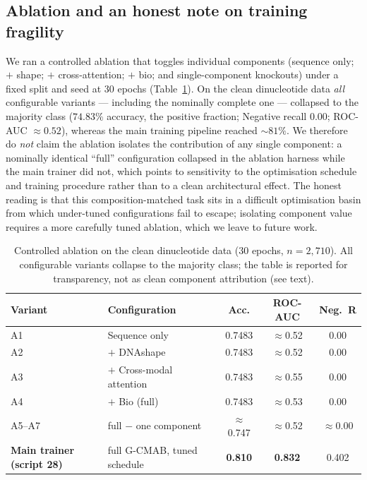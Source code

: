 \documentclass[11pt]{article}
\begin{document}
\subsection{Ablation and an honest note on training fragility}
We ran a controlled ablation that toggles individual components (sequence only;
$+$ shape; $+$ cross-attention; $+$ bio; and single-component knockouts) under a
fixed split and seed at $30$ epochs (Table~\ref{tab:abl}). On the clean dinucleotide
data \emph{all} configurable variants --- including the nominally complete one ---
collapsed to the majority class ($74.83\%$ accuracy, the positive fraction;
Negative recall $0.00$; ROC-AUC $\approx 0.52$), whereas the main training pipeline
reached $\sim\!81\%$. We therefore do \emph{not} claim the ablation isolates the
contribution of any single component: a nominally identical ``full'' configuration
collapsed in the ablation harness while the main trainer did not, which points to
sensitivity to the optimisation schedule and training procedure rather than to a
clean architectural effect. The honest reading is that this composition-matched task
sits in a difficult optimisation basin from which under-tuned configurations fail to
escape; isolating component value requires a more carefully tuned ablation, which we
leave to future work.

\begin{table}[ht]
\centering
\caption{Controlled ablation on the clean dinucleotide data ($30$ epochs,
$n=2{,}710$). All configurable variants collapse to the majority class; the table is
reported for transparency, not as clean component attribution (see text).}
\label{tab:abl}
\begin{tabular}{llccc}
\toprule
Variant & Configuration & Acc. & ROC-AUC & Neg.\ R \\
\midrule
A1 & Sequence only            & 0.7483 & $\approx$0.52 & 0.00 \\
A2 & $+$ DNAshape              & 0.7483 & $\approx$0.52 & 0.00 \\
A3 & $+$ Cross-modal attention & 0.7483 & $\approx$0.55 & 0.00 \\
A4 & $+$ Bio (full)           & 0.7483 & $\approx$0.53 & 0.00 \\
A5--A7 & full $-$ one component & $\approx$0.747 & $\approx$0.52 & $\approx$0.00 \\
\midrule
\textbf{Main trainer (script 28)} & full G-CMAB, tuned schedule & \textbf{0.810} & \textbf{0.832} & 0.402 \\
\bottomrule
\end{tabular}
\end{table}
\end{document}
